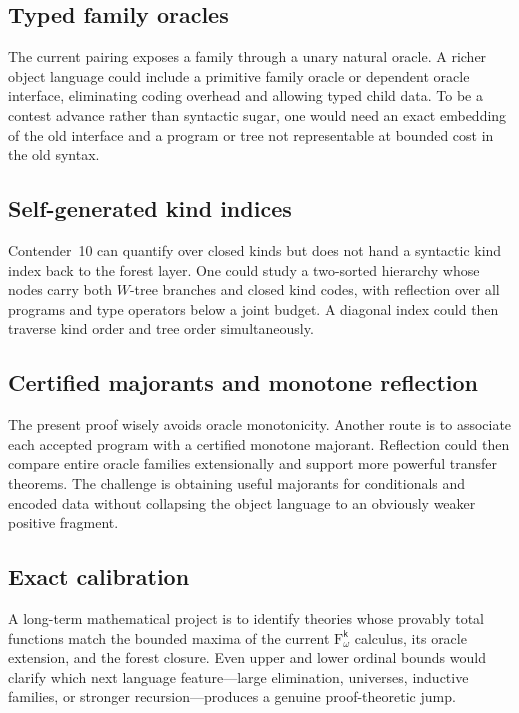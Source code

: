 \documentclass[11pt]{article}
\theoremstyle{definition}
\theoremstyle{remark}
\newcommand{\Fk}{\mathrm{F}_{\omega}^{\mathsf{k}}}
\begin{document}
\subsection{Typed family oracles}

The current pairing exposes a family through a unary natural oracle.  A richer
object language could include a primitive family oracle or dependent oracle
interface, eliminating coding overhead and allowing typed child data.  To be a
contest advance rather than syntactic sugar, one would need an exact embedding
of the old interface and a program or tree not representable at bounded cost in
the old syntax.

\subsection{Self-generated kind indices}

Contender~10 can quantify over closed kinds but does not hand a syntactic kind
index back to the forest layer.  One could study a two-sorted hierarchy whose
nodes carry both $W$-tree branches and closed kind codes, with reflection over
all programs and type operators below a joint budget.  A diagonal index could
then traverse kind order and tree order simultaneously.

\subsection{Certified majorants and monotone reflection}

The present proof wisely avoids oracle monotonicity.  Another route is to
associate each accepted program with a certified monotone majorant.  Reflection
could then compare entire oracle families extensionally and support more
powerful transfer theorems.  The challenge is obtaining useful majorants for
conditionals and encoded data without collapsing the object language to an
obviously weaker positive fragment.

\subsection{Exact calibration}

A long-term mathematical project is to identify theories whose provably total
functions match the bounded maxima of the current $\Fk$ calculus, its oracle
extension, and the forest closure.  Even upper and lower ordinal bounds would
clarify which next language feature---large elimination, universes, inductive
families, or stronger recursion---produces a genuine proof-theoretic jump.
\end{document}
